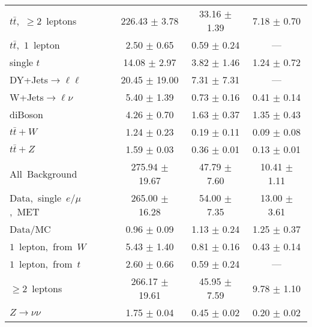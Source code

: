 \documentclass{article}
\begin{document}
\begin{longtable}{|l|c|c|c|}
$t\bar{t}$,~$\ge2$~leptons & 226.43 $\pm$ 3.78  & 33.16 $\pm$ 1.39  & 7.18 $\pm$ 0.70 \\* 
$t\bar{t}$,~$1$~lepton & 2.50 $\pm$ 0.65  & 0.59 $\pm$ 0.24  & --- \\* 
single $t$  & 14.08 $\pm$ 2.97  & 3.82 $\pm$ 1.46  & 1.24 $\pm$ 0.72 \\* 
DY+Jets$\rightarrow\ell\ell$  & 20.45 $\pm$ 19.00  & 7.31 $\pm$ 7.31  & --- \\* 
W+Jets$\rightarrow\ell\nu$  & 5.40 $\pm$ 1.39  & 0.73 $\pm$ 0.16  & 0.41 $\pm$ 0.14 \\* 
diBoson  & 4.26 $\pm$ 0.70  & 1.63 $\pm$ 0.37  & 1.35 $\pm$ 0.43 \\* 
$t\bar{t}+W$  & 1.24 $\pm$ 0.23  & 0.19 $\pm$ 0.11  & 0.09 $\pm$ 0.08 \\* 
$t\bar{t}+Z$  & 1.59 $\pm$ 0.03  & 0.36 $\pm$ 0.01  & 0.13 $\pm$ 0.01 \\* 
\hline \hline 
All~Background  & 275.94 $\pm$ 19.67  & 47.79 $\pm$ 7.60  & 10.41 $\pm$ 1.11 \\* 
Data,~single~$e/\mu$,~MET  & 265.00 $\pm$ 16.28  & 54.00 $\pm$ 7.35  & 13.00 $\pm$ 3.61 \\* 
Data/MC  & 0.96 $\pm$ 0.09  & 1.13 $\pm$ 0.24  & 1.25 $\pm$ 0.37 \\* 
\hline \hline 
$1$~lepton,~from~$W$  & 5.43 $\pm$ 1.40  & 0.81 $\pm$ 0.16  & 0.43 $\pm$ 0.14 \\* 
$1$~lepton,~from~$t$  & 2.60 $\pm$ 0.66  & 0.59 $\pm$ 0.24  & --- \\* 
$\ge2$~leptons  & 266.17 $\pm$ 19.61  & 45.95 $\pm$ 7.59  & 9.78 $\pm$ 1.10 \\* 
$Z\rightarrow\nu\nu$  & 1.75 $\pm$ 0.04  & 0.45 $\pm$ 0.02  & 0.20 $\pm$ 0.02 \\* 
\hline 
\end{longtable} 

 
 
 
 
\pagebreak 

 
 
 
 
\end{document}
